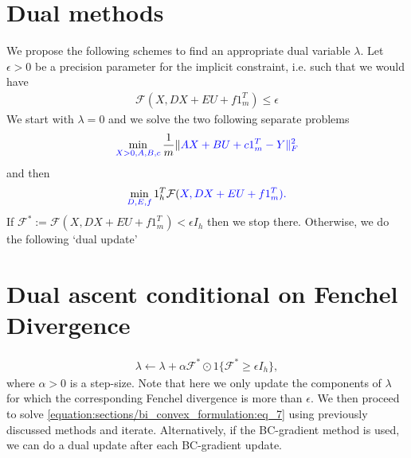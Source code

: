\documentclass[letterpaper,10pt,english]{sphinxmanual}
\begin{document}
\section{Dual methods}
\label{\detokenize{sections/dual_ascents:dual-methods}}
We propose the following schemes to  find an appropriate dual variable \(\lambda\). Let \(\epsilon > 0\) be a precision parameter
for the implicit constraint, i.e. such that we would have
\begin{equation*}
\begin{split}\mathcal{F}(X,DX + EU + f1_m^T) \leq \epsilon\end{split}
\end{equation*}
We start with \(\lambda = 0\) and we solve the two following separate problems
\begin{equation*}
\begin{split}\min_{\color{blue}{X} > 0, \color{blue}{A}, \color{blue}{B}, \color{blue}{c}} \frac{1}{m} \Vert \color{blue}{AX} + \color{blue}{B}U + \color{blue}{c}1_m^T - Y \Vert_F^2\end{split}
\end{equation*}
and then
\begin{equation*}
\begin{split}\min_{\color{blue}{D}, \color{blue}{E}, \color{blue}{f}} 1_h^T\mathcal{F}(\color{blue}{X},\color{blue}{DX} + \color{blue}{E}U + \color{blue}{f}1_m^T).\end{split}
\end{equation*}
If \(\mathcal{F}^* := \mathcal{F}(X,DX + EU + f1_m^T) < \epsilon I_h\) then we stop there. Otherwise, we do the following ‘dual
update’


\section{Dual ascent conditional on Fenchel Divergence}
\label{\detokenize{sections/dual_ascents:dual-ascent-conditional-on-fenchel-divergence}}\begin{equation}\label{equation:sections/dual_ascents:eq_8}
\begin{split}\lambda \leftarrow \lambda + \alpha \mathcal{F}^* \odot 1\{\mathcal{F}^* \geq \epsilon I_h\},\end{split}
\end{equation}
where \(\alpha > 0\) is a step-size. Note that here we only update the components of \(\lambda\) for which the corresponding
Fenchel divergence is more than \(\epsilon\). We then proceed to solve \eqref{equation:sections/bi_convex_formulation:eq_7} using previously discussed methods and
iterate. Alternatively, if the BC-gradient method is used, we can do a dual update after each BC-gradient
update.
\end{document}
